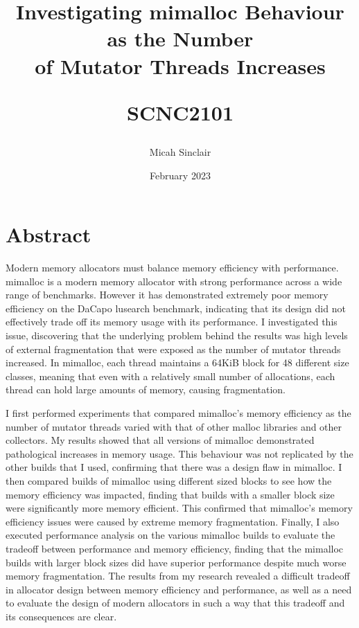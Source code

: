 \documentclass{article}
\begin{document}
\title{Investigating mimalloc Behaviour as the Number\\
of Mutator Threads Increases\\
\begin{large}
    SCNC2101
\end{large}}
\author{Micah Sinclair}
\date{February 2023}

\maketitle

\section*{Abstract}
Modern memory allocators must balance memory efficiency with performance. mimalloc is a modern memory allocator with strong performance across a wide range of benchmarks. However it has demonstrated extremely poor memory efficiency on the DaCapo lusearch benchmark, indicating that its design did not effectively trade off its memory usage with its performance.
I investigated this issue, discovering that the underlying problem behind the results was high levels of external fragmentation that were exposed as the number of mutator threads increased. In mimalloc, each thread maintains a 64KiB block for 48 different size classes, meaning that even with a relatively small number of allocations, each thread can hold large amounts of memory, causing fragmentation.

I first performed experiments that compared mimalloc's memory efficiency as the number of mutator threads varied with that of other malloc libraries and other collectors. My results showed that all versions of mimalloc demonstrated pathological increases in memory usage. This behaviour was not replicated by the other builds that I used, confirming that there was a design flaw in mimalloc. I then compared builds of mimalloc using different sized blocks to see how the memory efficiency was impacted, finding that builds with a smaller block size were significantly more memory efficient. This confirmed that mimalloc's memory efficiency issues were caused by extreme memory fragmentation. Finally, I also executed performance analysis on the various mimalloc builds to evaluate the tradeoff between performance and memory efficiency, finding that the mimalloc builds with larger block sizes did have superior performance despite much worse memory fragmentation.
The results from my research revealed a difficult tradeoff in allocator design between memory efficiency and performance, as well as a need to evaluate the design of modern allocators in such a way that this tradeoff and its consequences are clear.
\end{document}
